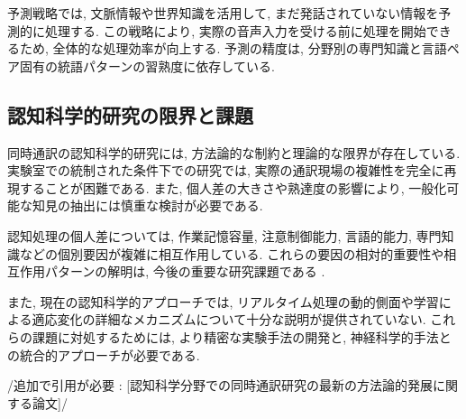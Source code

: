 予測戦略では, 文脈情報や世界知識を活用して, まだ発話されていない情報を予測的に処理する.
この戦略により, 実際の音声入力を受ける前に処理を開始できるため, 全体的な処理効率が向上する.
予測の精度は, 分野別の専門知識と言語ペア固有の統語パターンの習熟度に依存している.

\subsection{認知科学的研究の限界と課題}

同時通訳の認知科学的研究には, 方法論的な制約と理論的な限界が存在している.
実験室での統制された条件下での研究では, 実際の通訳現場の複雑性を完全に再現することが困難である.
また, 個人差の大きさや熟達度の影響により, 一般化可能な知見の抽出には慎重な検討が必要である.

認知処理の個人差については, 作業記憶容量, 注意制御能力, 言語的能力, 専門知識などの個別要因が複雑に相互作用している.
これらの要因の相対的重要性や相互作用パターンの解明は, 今後の重要な研究課題である \cite{christoffels2006cognitive}.

また, 現在の認知科学的アプローチでは, リアルタイム処理の動的側面や学習による適応変化の詳細なメカニズムについて十分な説明が提供されていない.
これらの課題に対処するためには, より精密な実験手法の開発と, 神経科学的手法との統合的アプローチが必要である.

{/追加で引用が必要 : [認知科学分野での同時通訳研究の最新の方法論的発展に関する論文]/}